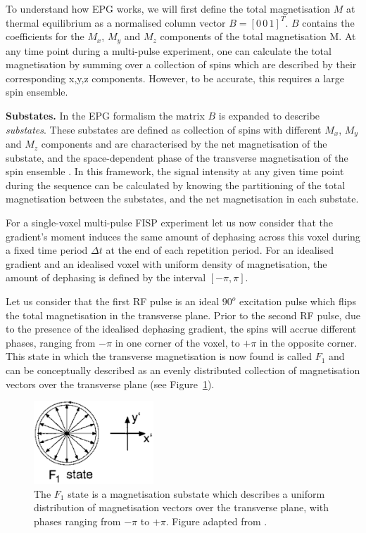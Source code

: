 \hfill

To understand how EPG works, we will first define the total magnetisation $M$ at thermal equilibrium as a normalised column vector $B = [0 \, 0 \, 1]^T$.
$B$ contains the coefficients for the $M_x$, $M_y$ and $M_z$ components of the total magnetisation M.
At any time point during a multi-pulse experiment, one can calculate the total magnetisation by summing over a collection of spins which are described by their corresponding x,y,z components.
However, to be accurate, this requires a large spin ensemble.

\hfill

\textbf{Substates.} In the EPG formalism the matrix $B$ is expanded to describe \textit{substates}.
These substates are defined as collection of spins with different $M_x$, $M_y$ and $M_z$ components and are characterised by the net magnetisation of the substate, and the space-dependent phase of the transverse magnetisation of the spin ensemble \cite{Hennig1988}.
In this framework, the signal intensity at any given time point during the sequence can be calculated by knowing the partitioning of the total magnetisation between the substates, and the net magnetisation in each substate.

\hfill

For a single-voxel multi-pulse FISP experiment let us now consider that the gradient's moment induces the same amount of dephasing across this voxel during a fixed time period $\Delta t$ at the end of each repetition period.
For an idealised gradient and an idealised voxel with uniform density of magnetisation,
the amount of dephasing is defined by the interval $[-\pi, \pi]$.

\hfill 

Let us consider that the first RF pulse is an ideal $90^o$ excitation pulse which flips the total magnetisation in the transverse plane.
Prior to the second RF pulse, due to the presence of the idealised dephasing gradient,
the spins will accrue different phases, ranging from $-\pi$ in one corner of the voxel, to $+\pi$ in the opposite corner.
This state in which the transverse magnetisation is now found is called $F_1$ \cite{Hennig1988} \cite{Scheffler1999} and can be conceptually described as an evenly distributed collection of magnetisation vectors over the transverse plane (see Figure~\ref{fig:F1state}). 

\begin{figure}[ht]
    \centering
    \includegraphics[angle=0,width=0.4\textwidth, keepaspectratio]{images/mrf/F1state}
    \caption{The $F_1$ state is a magnetisation substate which describes a uniform distribution of magnetisation vectors over the transverse plane, with phases ranging from $-\pi$ to $+\pi$. Figure adapted from \cite{Scheffler1999}.}
    \label{fig:F1state}
\end{figure}

